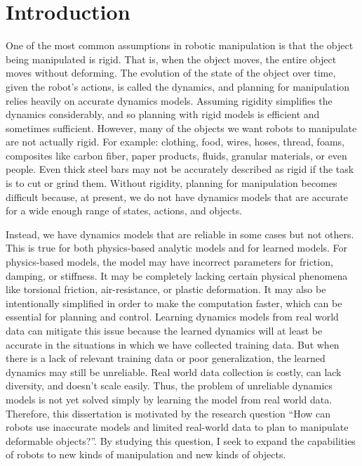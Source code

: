 \section{Introduction} \label{Intro:sec:Intro}

One of the most common assumptions in robotic manipulation is that the object being manipulated is rigid. That is, when the object moves, the entire object moves without deforming. The evolution of the state of the object over time, given the robot's actions, is called the dynamics, and planning for manipulation relies heavily on accurate dynamics models. Assuming rigidity simplifies the dynamics considerably, and so planning with rigid models is efficient and sometimes sufficient. However, many of the objects we want robots to manipulate are not actually rigid. For example: clothing, food, wires, hoses, thread, foams, composites like carbon fiber, paper products, fluids, granular materials, or even people. Even thick steel bars may not be accurately described as rigid if the task is to cut or grind them. Without rigidity, planning for manipulation becomes difficult because, at present, we do not have dynamics models that are accurate for a wide enough range of states, actions, and objects.

Instead, we have dynamics models that are reliable in some cases but not others. This is true for both physics-based analytic models and for learned models. For physics-based models, the model may have incorrect parameters for friction, damping, or stiffness. It may be completely lacking certain physical phenomena like torsional friction, air-resistance, or plastic deformation. It may also be intentionally simplified in order to make the computation faster, which can be essential for planning and control. Learning dynamics models from real world data can mitigate this issue  because the learned dynamics will at least be accurate in the situations in which we have collected training data. But when there is a lack of relevant training data or poor generalization, the learned dynamics may still be unreliable. Real world data collection is costly, can lack diversity, and doesn't scale easily. Thus, the problem of unreliable dynamics models is not yet solved simply by learning the model from real world data. Therefore, this dissertation is motivated by the research question ``How can robots use inaccurate models and limited real-world data to plan to manipulate deformable objects?''. By studying this question, I seek to expand the capabilities of robots to new kinds of manipulation and new kinds of objects.

